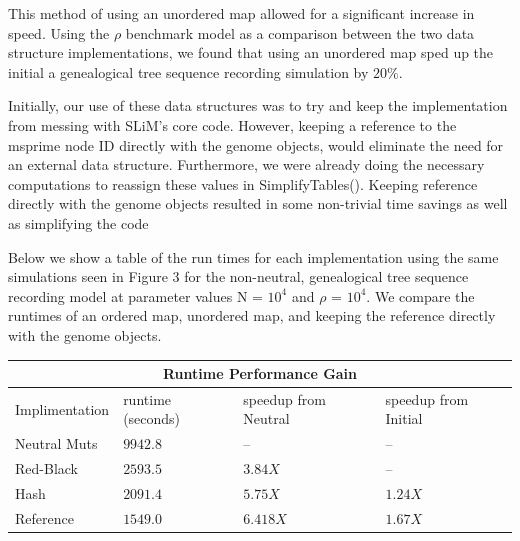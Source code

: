 \documentclass{article}
\begin{document}

This method of using an unordered map allowed for a significant
increase in speed. Using the $\rho$ benchmark model as a comparison between the two data structure implementations, we found that using an unordered map sped up the initial a genealogical tree sequence recording simulation by $20\%$.

Initially, our use of these data structures was to try and keep the implementation from messing with SLiM's core code. 
However, keeping a reference to the msprime 
node ID directly with the genome objects, 
would eliminate the need for an external data structure.
Furthermore, we were already doing the 
necessary computations to reassign these values in SimplifyTables().
Keeping reference directly with the genome objects resulted in 
some non-trivial time savings as well as simplifying the code

Below we show a table of the run times for each implementation using the same simulations seen in Figure 3 for the non-neutral, genealogical tree sequence recording model at parameter values N = $10^{4}$ and $\rho$ = $10^{4}$. 
We compare the runtimes of an ordered map, unordered map, and keeping the reference directly with the genome objects. 


\vspace{5mm} %
\begin{tabular}{ |p{2.2cm}||p{2.2cm}|p{2.2cm}|p{2.2cm}|  }
 \hline
 \multicolumn{4}{|c|}{Runtime Performance Gain} \\
 \hline
 Implimentation  & runtime \newline (seconds) & speedup from Neutral & speedup from Initial\\
 \hline
Neutral Muts   & $9942.8$ & -- &  --\\
Red-Black  & $2593.5$ & $3.84X$ & --\\
Hash & $2091.4$ & $5.75X$ & $1.24X$\\
Reference & $1549.0$ & $6.418X$ & $1.67X$\\

 \hline
\end{tabular}

\newpage
\end{document}
